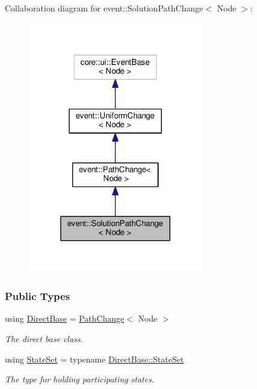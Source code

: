Collaboration diagram for event\+:\+:Solution\+Path\+Change$<$ Node $>$\+:\nopagebreak
\begin{figure}[H]
\begin{center}
\leavevmode
\includegraphics[width=216pt]{structevent_1_1SolutionPathChange__coll__graph}
\end{center}
\end{figure}
\subsubsection*{Public Types}
\begin{DoxyCompactItemize}
\item 
using \hyperlink{structevent_1_1SolutionPathChange_a0f11b5f2a971d80d69e4ae03064506bd}{Direct\+Base} = \hyperlink{structevent_1_1PathChange}{Path\+Change}$<$ Node $>$\hypertarget{structevent_1_1SolutionPathChange_a0f11b5f2a971d80d69e4ae03064506bd}{}\label{structevent_1_1SolutionPathChange_a0f11b5f2a971d80d69e4ae03064506bd}

\begin{DoxyCompactList}\small\item\em The direct base class. \end{DoxyCompactList}\item 
using \hyperlink{structevent_1_1SolutionPathChange_a37f985dddd6b147a30a6cd0ee2dfdaf1}{State\+Set} = typename \hyperlink{structevent_1_1UniformChange_a71997f4cc920d6c5c65fab2049d5e42d}{Direct\+Base\+::\+State\+Set}\hypertarget{structevent_1_1SolutionPathChange_a37f985dddd6b147a30a6cd0ee2dfdaf1}{}\label{structevent_1_1SolutionPathChange_a37f985dddd6b147a30a6cd0ee2dfdaf1}

\begin{DoxyCompactList}\small\item\em The type for holding participating states. \end{DoxyCompactList}\end{DoxyCompactItemize}
